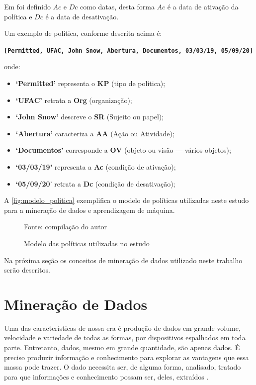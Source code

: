 Em  foi definido $ Ac $ e $ Dc $ como datas, desta forma $ Ac $ é a data de ativação da política e $ Dc $ é a data de desativação.

Um exemplo de política, conforme descrita acima é:

\textbf{\texttt{[Permitted, UFAC, John Snow, Abertura, Documentos, 03/03/19, 05/09/20]}}

onde:
\begin{itemize}
	\item \textbf{`Permitted'} representa o \textbf{KP} (tipo de política); 
	\item \textbf{`UFAC'} retrata a \textbf{Org} (organização);
	\item \textbf{`John Snow'} descreve o \textbf{SR} (Sujeito ou papel);
	\item \textbf{`Abertura'} caracteriza a \textbf{AA} (Ação ou Atividade);
	\item \textbf{`Documentos'} corresponde a \textbf{OV} (objeto ou visão --- vários objetos);
	\item \textbf{`03/03/19'} representa a \textbf{Ac} (condição de ativação);
	\item \textbf{`05/09/20}' retrata a \textbf{Dc} (condição de desativação);
\end{itemize}

A \autoref{fig:modelo_politica} exemplifica o modelo de políticas utilizadas neste estudo para a mineração de dados e aprendizagem de máquina.

\begin{figure}[h!]
	\centering
	\caption{Modelo das políticas utilizadas no estudo}
	
	{\scriptsize Fonte: compilação do autor}
	\label{fig:modelo_politica}
\end{figure}

Na próxima seção os conceitos de mineração de dados utilizado neste trabalho serão descritos.

\section{Mineração de Dados}\label{mineracao_dados}
Uma das características de nossa era é produção de dados em grande volume, velocidade e variedade de todas as formas, por dispositivos espalhados em toda parte. Entretanto, dados, mesmo em grande quantidade, são apenas dados. É preciso produzir informação e conhecimento para explorar as vantagens que essa massa pode trazer. O dado necessita ser, de alguma forma, analisado, tratado para que informações e conhecimento possam ser, deles, extraídos \cite{aprenda_mineracao_fernando_amaral16} \cite{ferrari2017}.

